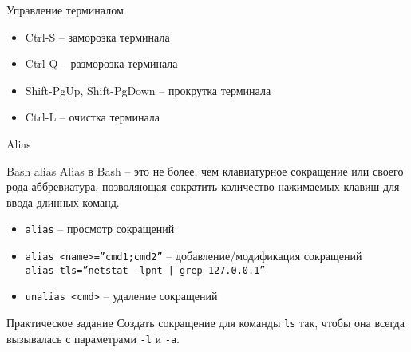 \begin{frame}{Управление терминалом}
      \begin{itemize}
        \item Ctrl-S -- заморозка терминала
        \item Ctrl-Q -- разморозка терминала
        \item \alert{Shift-PgUp}, \alert{Shift-PgDown} -- прокрутка терминала
        \item \alert{Ctrl-L} -- очистка терминала
      \end{itemize}
\end{frame}


\begin{frame}{Alias}
  \begin{block}{Bash alias}
    Alias в Bash -- это не более, чем клавиатурное сокращение или своего рода аббревиатура, 
    позволяющая сократить количество нажимаемых клавиш для ввода длинных команд.

    \begin{itemize}
        \item {\tt alias} -- просмотр сокращений
	\item {\tt alias <name>=''cmd1;cmd2''} -- добавление/модификация сокращений \\
	      {\tt alias tls=''netstat -lpnt | grep 127.0.0.1''}
        \item {\tt unalias <cmd>} -- удаление сокращений
    \end{itemize}
  \end{block}

  \pause
  \begin{block}{Практическое задание}
  Создать сокращение для команды {\tt ls} так, чтобы она всегда вызывалась с параметрами {\tt -l} и {\tt -a}.
  \end{block}

\end{frame}
